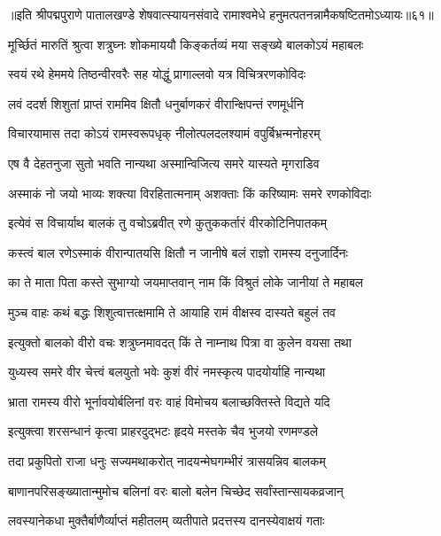 {॥इति श्रीपद्मपुराणे पातालखण्डे शेषवात्स्यायनसंवादे रामाश्वमेधे हनुमत्पतनन्नामैकषष्टितमोऽध्यायः॥६१॥}

\resetShloka


\twolineshloka
{मूर्च्छितं मारुतिं श्रुत्वा शत्रुघ्नः शोकमाययौ}
{किङ्कर्तव्यं मया सङ्ख्ये बालकोऽयं महाबलः}%

\twolineshloka
{स्वयं रथे हेममये तिष्ठन्वीरवरैः सह}
{योद्धुं प्रागाल्लवो यत्र विचित्ररणकोविदः}%

\twolineshloka
{लवं ददर्श शिशुतां प्राप्तं राममिव क्षितौ}
{धनुर्बाणकरं वीरान्क्षिपन्तं रणमूर्धनि}%

\twolineshloka
{विचारयामास तदा कोऽयं रामस्वरूपधृक्}
{नीलोत्पलदलश्यामं वपुर्बिभ्रन्मनोहरम्}%

\twolineshloka
{एष वै देहतनुजा सुतो भवति नान्यथा}
{अस्मान्विजित्य समरे यास्यते मृगराडिव}%

\twolineshloka
{अस्माकं नो जयो भाव्यः शक्त्या विरहितात्मनाम्}
{अशक्ताः किं करिष्यामः समरे रणकोविदाः}%

\twolineshloka
{इत्येवं स विचार्याथ बालकं तु वचोऽब्रवीत्}
{रणे कुतुककर्तारं वीरकोटिनिपातकम्}%

\twolineshloka
{कस्त्वं बाल रणेऽस्माकं वीरान्पातयसि क्षितौ}
{न जानीषे बलं राज्ञो रामस्य दनुजार्दिनः}%

\twolineshloka
{का ते माता पिता कस्ते सुभाग्यो जयमाप्तवान्}
{नाम किं विश्रुतं लोके जानीयां ते महाबल}%

\twolineshloka
{मुञ्च वाहः कथं बद्धः शिशुत्वात्तत्क्षमामि ते}
{आयाहि रामं वीक्षस्व दास्यते बहुलं तव}%

\twolineshloka
{इत्युक्तो बालको वीरो वचः शत्रुघ्नमावदत्}
{किं ते नाम्नाथ पित्रा वा कुलेन वयसा तथा}%

\twolineshloka
{युध्यस्व समरे वीर चेत्त्वं बलयुतो भवेः}
{कुशं वीरं नमस्कृत्य पादयोर्याहि नान्यथा}%

\twolineshloka
{भ्राता रामस्य वीरो भूर्नावयोर्बलिनां वरः}
{वाहं विमोचय बलाच्छक्तिस्ते विद्यते यदि}%

\twolineshloka
{इत्युक्त्वा शरसन्धानं कृत्वा प्राहरदुद्भटः}
{हृदये मस्तके चैव भुजयो रणमण्डले}%

\twolineshloka
{तदा प्रकुपितो राजा धनुः सज्यमथाकरोत्}
{नादयन्मेघगम्भीरं त्रासयन्निव बालकम्}%

\twolineshloka
{बाणानपरिसङ्ख्यातान्मुमोच बलिनां वरः}
{बालो बलेन चिच्छेद सर्वांस्तान्सायकव्रजान्}%

\twolineshloka
{लवस्यानेकधा मुक्तैर्बाणैर्व्याप्तं महीतलम्}
{व्यतीपाते प्रदत्तस्य दानस्येवाक्षयं गताः}%

